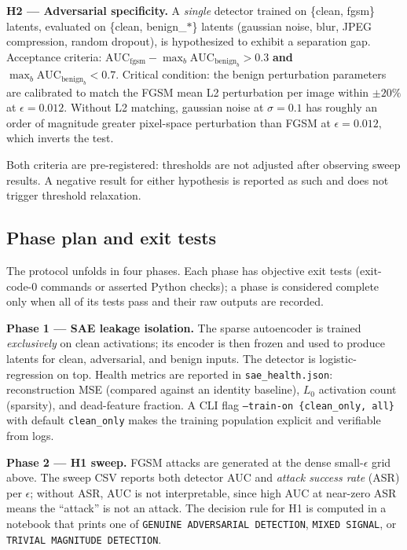 \documentclass[../ppgc-tese.tex]{subfiles}
\begin{document}
\textbf{H2 --- Adversarial specificity.} A \emph{single} detector trained on \{clean, fgsm\} latents, evaluated on \{clean, benign\_$*$\} latents (gaussian noise, blur, JPEG compression, random dropout), is hypothesized to exhibit a separation gap. Acceptance criteria: $\mathrm{AUC}_{\mathrm{fgsm}} - \max_b \mathrm{AUC}_{\mathrm{benign}_b} > 0.3$ \textbf{and} $\max_b \mathrm{AUC}_{\mathrm{benign}_b} < 0.7$. Critical condition: the benign perturbation parameters are calibrated to match the FGSM mean L2 perturbation per image within $\pm 20\%$ at $\epsilon = 0.012$. Without L2 matching, gaussian noise at $\sigma = 0.1$ has roughly an order of magnitude greater pixel-space perturbation than FGSM at $\epsilon = 0.012$, which inverts the test.

Both criteria are pre-registered: thresholds are not adjusted after observing sweep results. A negative result for either hypothesis is reported as such and does not trigger threshold relaxation.

\subsection{Phase plan and exit tests}
The protocol unfolds in four phases. Each phase has objective exit tests (exit-code-0 commands or asserted Python checks); a phase is considered complete only when all of its tests pass and their raw outputs are recorded.

\textbf{Phase 1 --- SAE leakage isolation.} The sparse autoencoder is trained \emph{exclusively} on clean activations; its encoder is then frozen and used to produce latents for clean, adversarial, and benign inputs. The detector is logistic-regression on top. Health metrics are reported in \texttt{sae\_health.json}: reconstruction MSE (compared against an identity baseline), $L_0$ activation count (sparsity), and dead-feature fraction. A CLI flag \texttt{--train-on \{clean\_only, all\}} with default \texttt{clean\_only} makes the training population explicit and verifiable from logs.

\textbf{Phase 2 --- H1 sweep.} FGSM attacks are generated at the dense small-$\epsilon$ grid above. The sweep CSV reports both detector AUC and \emph{attack success rate} (ASR) per $\epsilon$; without ASR, AUC is not interpretable, since high AUC at near-zero ASR means the ``attack'' is not an attack. The decision rule for H1 is computed in a notebook that prints one of \texttt{GENUINE ADVERSARIAL DETECTION}, \texttt{MIXED SIGNAL}, or \texttt{TRIVIAL MAGNITUDE DETECTION}.
\end{document}
